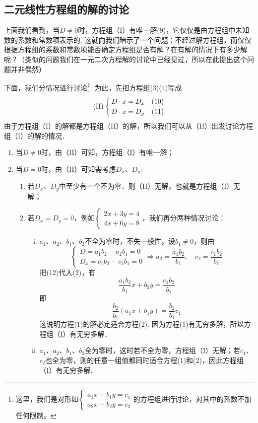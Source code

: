 \subsection{二元线性方程组的解的讨论}
上面我们看到，当$D\ne 0$时，方程组（I）有唯一解(9)，它仅仅是由方程组中未知数的系数和常数项表示的. 这就向我们暗示了一个问题：不经过解方程组，而仅仅根据方程组的系数和常数项能否确定方程组是否有解？在有解的情况下有多少解呢？（类似的问题我们在一元二次方程解的讨论中已经见过，所以在此提出这个问题并非偶然）

下面，我们分情况进行讨论\footnote{这里，我们是对形如$\begin{cases}
  a_1x+b_1y=c_1\\
  a_2x+b_2y=c_2
\end{cases}$的方程组进行讨论，对其中的系数不加任何限制。}. 为此，先把方程组(3)(4)写成
\[({\rm II})\begin{cases}
  D\cdot x=D_x & (10)\\
  D\cdot x=D_y &(11)
\end{cases}\]
由于方程组（I）的解都是方程组（II）的解，所以我们可以从（II）出发讨论方程组（I）的解的情况．
\begin{enumerate}
  \item 当$D\ne 0$时，由（II）可知，方程组（I）有唯一解；
\item 当$D=0$时，由（II）可知需考虑$D_x$、$D_y$:
\begin{enumerate}[(1)]
  \item 若$D_x$、$D_y$中至少有一个不为零．则（II）无解，也就是方程组（I）无解；
  \item 若$D_x=D_y=0$，例如$\begin{cases}
    2x+3y=4\\ 4x+6y=8
  \end{cases}$，我们再分两种情况讨论：
  \begin{enumerate}[(i)]
    \item $a_1$、$a_2$、$b_1$、$b_2$不全为零时，不失一般性，设$b_1\ne 0$，则由
\begin{equation}
  \begin{cases}
    D=a_1b_2-a_2b_1 =0\\
    D_x=c_1b_2-c_2b_1=0
  \end{cases}\Longrightarrow a_2=\frac{a_1b_2}{b_1},\quad c_2=\frac{c_1b_2}{b_1}  \tag{12}
\end{equation}    
把(12)代入(2)，有
\[\frac{a_1b_2}{b_1}x+b_2y=\frac{c_1b_2}{b_1}\]
即
\begin{equation}
  \frac{b_2}{b_1}(a_1x+b_1y)=\frac{b_2}{b_1}c_1 \tag{13}
\end{equation}
这说明方程(1)的解必定适合方程(2). 因为方程(1)有无穷多解，所以方程组（I）有无穷多解．
\item $a_1$、$a_2$、$b_1$、$b_2$全为零时，这时若不全为零，方程组（I）无解；若$c_1$、$c_2$也全为零，则的任意一组值都同时适合方程(1)和(2)，因此方程组（I）有无穷多解.
  \end{enumerate}
\end{enumerate}
\end{enumerate}

